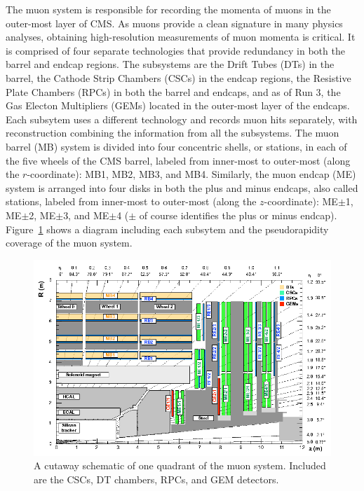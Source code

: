 The muon system \cite{MuonTDR} is responsible for recording the momenta of muons in the outer-most layer of CMS. As muons provide a clean signature in many physics analyses, obtaining high-resolution measurements of muon momenta is critical. It is comprised of four separate technologies that provide redundancy in both the barrel and endcap regions. The subsystems are the Drift Tubes (DTs) in the barrel, the Cathode Strip Chambers (CSCs) in the endcap regions, the Resistive Plate Chambers (RPCs) in both the barrel and endcaps, and as of Run 3, the Gas Electon Multipliers (GEMs) located in the outer-most layer of the endcaps. Each subsytem uses a different technology and records muon hits separately, with reconstruction combining the information from all the subsystems. The muon barrel (MB) system is divided into four concentric shells, or stations, in each of the five wheels of the CMS barrel, labeled from inner-most to outer-most (along the $r$-coordinate): MB1, MB2, MB3, and MB4. Similarly, the muon endcap (ME) system is arranged into four disks in both the plus and minus endcaps, also called stations, labeled from inner-most to outer-most (along the $z$-coordinate): ME$\pm$1, ME$\pm$2, ME$\pm$3, and ME$\pm$4 ($\pm$ of course identifies the plus or minus endcap). Figure~\ref{fig:MuonSystem} shows a diagram including each subsytem and the pseudorapidity coverage of the muon system.

\begin{figure}[H]
    \centering
    \includegraphics[width=1\textwidth]{Images/CMS/MuonSystem.png}
    \caption{A cutaway schematic of one quadrant of the muon system. Included are the CSCs, DT chambers, RPCs, and GEM detectors.}
    \label{fig:MuonSystem}
\end{figure}

